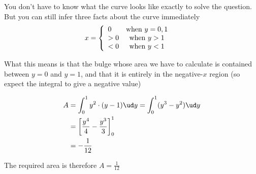 \begin{solution}
  You don't have to know what the curve looks like exactly to solve the question. 
  But you can still infer three facts about the curve immediately
  \begin{align}
      x &= \left\lbrace
              \begin{array}{l c}
                 0 & \text{when }y=0,1 \\
                 > 0 & \text{when }y > 1 \\
                 < 0 & \text{when }y < 1
              \end{array}\right.
  \end{align}
  
  What this means is that the bulge whose area we have to calculate is 
  contained between $y=0$ and $y=1$, and that it is entirely in the 
  negative-$x$ region (so expect the integral to give a negative value)
  
  \begin{align}
     A &= \int_0^1 y^2\cdot(y-1)\ud y = \int_0^1(y^3-y^2)\ud y \\
       &= \left[ \dfrac{y^4}{4} - \dfrac{y^3}{3}\right]_0^1 \\
       &= -\dfrac{1}{12}
  \end{align}
  
  The required area is therefore $A = \frac{1}{12}$
\end{solution}
